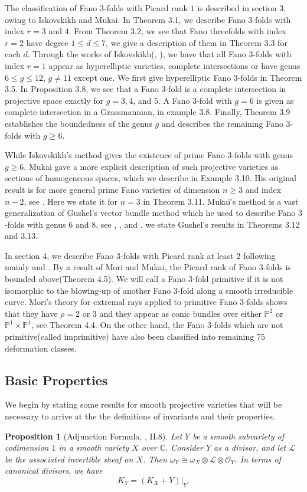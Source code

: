 \documentclass[11pt]{amsart}
\theoremstyle{plain}
\newtheorem{proposition}[theorem]{Proposition}
\theoremstyle{definition}
\theoremstyle{expl}
\begin{document}
The classification of Fano $3$-folds with Picard rank $1$ is described in section $3$, owing to Iskovskikh and Mukai. In Theorem 3.1, we describe Fano $3$-folds with index $r=3$ and $4$. From Theorem 3.2, we see that Fano threefolds with index $r=2$ have degree $1\leq d \leq 7$, we give a description of them in Theorem 3.3 for each $d$. Through the works of Iskovskikh(\cite{Isk77}, \cite{Isk78}), we have that all Fano $3$-folds with index $r=1$ appear as hyperelliptic varieties, complete intersections or have genus $6 \leq g \leq 12$, $g\neq 11$ except one. We first give hyperelliptic Fano $3$-folds in Theorem 3.5. In Proposition $3.8$, we see that a Fano $3$-fold is a complete intersection in projective space exactly for $g=3,4$, and $5$. A Fano $3$-fold with $g=6$ is given as complete intersection in a Grassmannian, in example 3.8. Finally, Theorem 3.9 establishes the boundedness of the genus $g$ and describes the remaining Fano $3$-folds with $g\geq 6$. 

While Iskovskikh's method gives the existence of prime Fano $3$-folds with genus $g \geq 6$, Mukai gave a more explicit description of such projective varieties as sections of homogeneous spaces, which we describe in Example 3.10. His original result is for more general prime Fano varieties of dimension $n\geq 3$ and index $n-2$, see \cite{Muk89}. Here we state it for $n=3$ in Theorem 3.11. Mukai's method is a vast generalization of Gushel's vector bundle method which he used to describe Fano $3$-folds with genus $6$ and $8$, see \cite{Gus6}, \cite{Gus83}, and \cite{Gus92}. we state Gushel's results in Theorems 3.12 and 3.13.

In section 4, we describe Fano $3$-folds with Picard rank at least $2$ following mainly \cite{MM81} and \cite{MM83}. By a result of Mori and Mukai, the Picard rank of Fano $3$-folds is bounded above(Theorem 4.5). We will call a Fano $3$-fold primitive if it is not isomorphic to the blowing-up of another Fano $3$-fold along a smooth irreducible curve. 
Mori's theory for extremal rays applied to primitive Fano $3$-folds shows that they have $\rho =2 $ or $3$ and they appear as conic bundles over either $\mathbb{P}^2$ or $\mathbb{P}^1 \times \mathbb{P}^1$, see Theorem 4.4. On the other hand, the Fano $3$-folds which are not primitive(called imprimitive) have also been classified into remaining 75 deformation classes. 

\subsection{Basic Properties} We begin by stating some results for smooth projective varieties that will be necessary to arrive at the the definitions of invariants and their properties. 
\begin{proposition}[Adjunction Formula, \cite{Hartshorne}, II.8]
    Let $Y$ be a smooth subvariety of codimension $1$ in a smooth variety $X$ over $\mathbb{C}$. Consider $Y$ as a divisor, and let $\mathcal{L}$ be the associated invertible sheaf on $X$. Then $\omega_Y \cong \omega_X \otimes \mathcal{L}\otimes \mathcal{O}_Y$. In terms of canonical divisors, we have 
    \[
    K_Y = (K_X+Y)|_Y.
    \]
\end{proposition}
\end{document}
